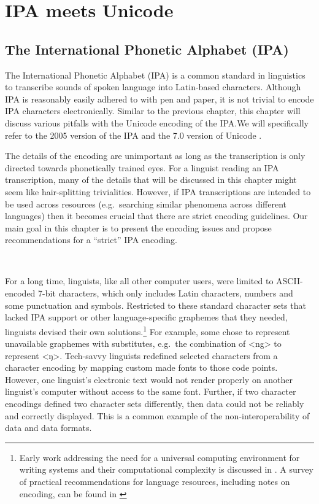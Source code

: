 \chapter{IPA meets Unicode}
\label{ipa-meets-unicode}

\section{The International Phonetic Alphabet (IPA)}
\label{the-international-phonetic-alphabet}

The International Phonetic Alphabet (IPA) is a common standard in linguistics to
transcribe sounds of spoken language into Latin-based characters. Although IPA
is reasonably easily adhered to with pen and paper, it is not trivial to encode
IPA characters electronically. Similar to the previous chapter, this chapter
will discuss various pitfalls with the Unicode encoding of the IPA.\@ We will
specifically refer to the 2005 version of the IPA \citep{IPA2005} and the 7.0 
version of Unicode \citep{Unicode2014}.

The details of the encoding are unimportant as long as the
transcription is only directed towards phonetically trained eyes. For a linguist
reading an IPA transcription, many of the details that will be discussed in this
chapter might seem like hair-splitting trivialities. However, if IPA
transcriptions are intended to be used across resources (e.g.~searching similar
phenomena across different languages) then it becomes crucial that there are strict
encoding guidelines. Our main goal in this chapter is to present the encoding
issues and propose recommendations for a ``strict'' IPA encoding.

\ 

\noindent For a long time, linguists, like all other computer users, were
limited to ASCII-encoded 7-bit characters, which only includes Latin characters,
numbers and some punctuation and symbols. Restricted to these standard character
sets that lacked IPA support or other language-specific graphemes that they
needed, linguists devised their own solutions.\footnote{Early work addressing
the need for a universal computing environment for writing systems and their
computational complexity is discussed in \citet{Simons1989}. A survey of
practical recommendations for language resources, including notes on encoding,
can be found in \citet{BirdSimons2003}} For example, some chose to represent
unavailable graphemes with substitutes, e.g.~the combination of <ng> to
represent <ŋ>. Tech-savvy linguists redefined selected characters from a
character encoding by mapping custom made fonts to those code points. However,
one linguist's electronic text would not render properly on another linguist's
computer without access to the same font. Further, if two character encodings
defined two character sets differently, then data could not be reliably and
correctly displayed. This is a common example of the non-interoperability of
data and data formats.

